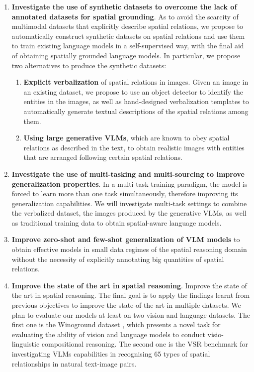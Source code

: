 \begin{enumerate}
    \item \textbf{Investigate the use of synthetic datasets to overcome the lack of annotated datasets for spatial grounding}. As to avoid the scarcity of multimodal datasets that explicitly describe spatial relations, we propose to automatically construct synthetic datasets on spatial relations and use them to train existing language models in a self-supervised way, with the final aid of obtaining spatially grounded language models. In particular, we propose two alternatives to produce the synthetic datasets:
    \begin{enumerate}
        \item \textbf{Explicit verbalization} of spatial relations in images. Given an image in an existing dataset, we propose to use an object detector to identify the entities in the images, as well as hand-designed verbalization templates to automatically generate textual descriptions of the spatial relations among them.
        \item \textbf{Using large generative VLMs}, which are known to obey spatial relations as described in the text, to obtain realistic images with entities that are arranged following certain spatial relations.
    \end{enumerate}
    \item \textbf{Investigate the use of multi-tasking and multi-sourcing to improve generalization properties}. In a multi-task training paradigm, the model is forced to learn more than one task simultaneously, therefore improving its generalization capabilities. We will investigate multi-task settings to combine the verbalized dataset, the images produced by the generative VLMs, as well as traditional training data to obtain spatial-aware language models.
    \item \textbf{Improve zero-shot and few-shot generalization of VLM models} to obtain effective models in small data regimes of the spatial reasoning domain without the necessity of explicitly annotating big quantities of spatial relations.
    \item \textbf{Improve the state of the art in spatial reasoning}. Improve the state of the art in spatial reasoning. The final goal is to apply the findings learnt from previous objectives to improve the state-of-the-art in multiple datasets. We plan to evaluate our models at least on two vision and language datasets. The first one is the Winoground dataset \cite{thrush2022winoground}, which presents a novel task for evaluating the ability of vision and language models to conduct visio-linguistic compositional reasoning. The second one is the VSR benchmark \cite{liu2022visual} for investigating VLMs capabilities in recognising 65 types of spatial relationships in natural text-image pairs.
\end{enumerate}


